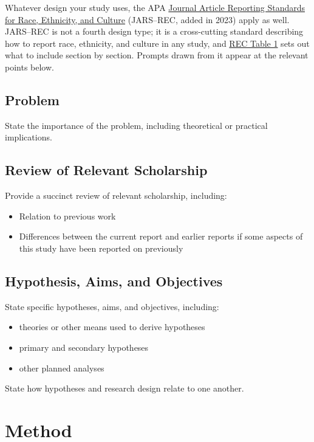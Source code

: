 \documentclass[acmsmall,screen,anonymous,review]{acmart}
\begin{document}
Whatever design your study uses, the APA \href{https://apastyle.apa.org/jars/race-ethnicity-culture}{Journal Article Reporting Standards for Race, Ethnicity, and Culture} (JARS--REC, added in 2023) apply as well. JARS--REC is not a fourth design type; it is a cross-cutting standard describing how to report race, ethnicity, and culture in any study, and \href{https://apastyle.apa.org/jars/rec-table-1.pdf}{REC Table 1} sets out what to include section by section. Prompts drawn from it appear at the relevant points below.
\subsection{Problem}

State the importance of the problem, including theoretical or practical implications.

\subsection{Review of Relevant Scholarship}

Provide a succinct review of relevant scholarship, including: 

\begin{itemize}
    \item Relation to previous work
    \item Differences between the current report and earlier reports if some aspects of this study have been reported on previously
\end{itemize}

\subsection{Hypothesis, Aims, and Objectives}

State specific hypotheses, aims, and objectives, including:
\begin{itemize}
    \item theories or other means used to derive hypotheses
    \item primary and secondary hypotheses
    \item other planned analyses
\end{itemize}

State how hypotheses and research design relate to one another.

\section{Method}
\end{document}
